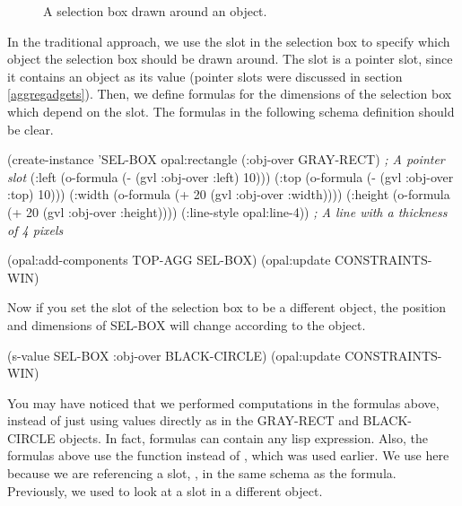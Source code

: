 \begin{figure}
\begin{center}
\begin{makeimage}
\end{makeimage}
\begin{latexonly}
\end{latexonly}
\end{center}
\caption{A selection box drawn around an object.}
\end{figure}

In the traditional approach, we use the slot  in the
selection box to specify which object the selection box should be
drawn around.  The  slot is a pointer slot, since it
contains an object as its value (pointer slots were discussed in
section \ref{aggregadgets}).  Then, we define formulas for the
dimensions of the selection box which depend on the 
slot.  The formulas in the following schema definition should be clear.

\begin{programexample}
(create-instance 'SEL-BOX opal:rectangle
   (:obj-over GRAY-RECT)  {\it ; A pointer slot}
   (:left (o-formula (- (gvl :obj-over :left) 10)))
   (:top (o-formula (- (gvl :obj-over :top) 10)))
   (:width (o-formula (+ 20 (gvl :obj-over :width))))
   (:height (o-formula (+ 20 (gvl :obj-over :height))))
   (:line-style opal:line-4))  {\it ; A line with a thickness of 4 pixels}
		
(opal:add-components TOP-AGG SEL-BOX)
(opal:update CONSTRAINTS-WIN)
\end{programexample}

Now if you set the  slot of the selection box to be a
different object, the position and dimensions of SEL-BOX will change
according to the object.

\begin{programexample}
(s-value SEL-BOX :obj-over BLACK-CIRCLE)
(opal:update CONSTRAINTS-WIN)
\end{programexample}

You may have noticed that we performed computations in the formulas
above, instead of just using values directly as in the GRAY-RECT and
BLACK-CIRCLE objects.  In fact, formulas can contain any lisp
expression.  Also, the formulas above use the function 
instead of , which was used earlier.  We use  here
because we are referencing a slot, , in the same schema
as the formula.  Previously, we used  to look at a slot in a
different object.

